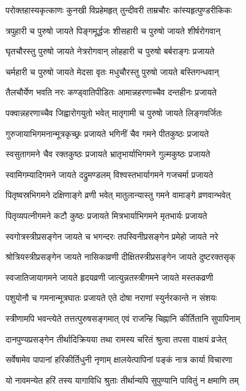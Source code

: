 \twolineshloka
{परोक्तहास्यकृत्काणः कुनखी विप्रहेमहृत्}
{तुन्दीवरी ताम्रचौरः कांस्यहृत्पुण्डरीकिकः}%

\twolineshloka
{त्रपुहारी च पुरुषो जायते पिङ्गमूर्द्धजः}
{शीसहारी च पुरुषो जायते शीर्षरोगवान्}%

\twolineshloka
{घृतचौरस्तु पुरुषो जायते नेत्ररोगवान्}
{लोहहारी च पुरुषो बर्बराङ्गः प्रजायते}%

\twolineshloka
{चर्महारी च पुरुषो जायते मेदसा वृतः}
{मधुचौरस्तु पुरुषो जायते बस्तिगन्धवान्}%

\twolineshloka
{तैलचौर्येण भवति नरः कण्ड्वातिपीडितः}
{आमान्नहरणाच्चैव दन्तहीनः प्रजायते}%

\twolineshloka
{पक्वान्नहरणाच्चैव जिह्वारोगयुतो भवेत्}
{मातृगामी च पुरुषो जायते लिङ्गवर्जितः}%

\twolineshloka
{गुरुजायाभिगमनान्मूत्रकृच्छ्रः प्रजायते}
{भगिनीं चैव गमने पीतकुष्ठः प्रजायते}%

\twolineshloka
{स्वसुतागमने चैव रक्तकुष्ठः प्रजायते}
{भ्रातृभार्याभिगमने गुल्मकुष्ठः प्रजायते}%

\twolineshloka
{स्वामिगम्यादिगमने जायते दद्रुमण्डलम्}
{विश्वस्तभार्यागमने गजचर्मा प्रजायते}%

\twolineshloka
{पितृष्वस्रभिगमने दक्षिणाङ्गे व्रणी भवेत्}
{मातुलान्यास्तु गमने वामाङ्गे व्रणवान्भवेत्}%

\twolineshloka
{पितृव्यपत्नीगमने कटौ कुष्ठः प्रजायते}
{मित्रभार्याभिगमने मृतभार्यः प्रजायते}%

\twolineshloka
{स्वगोत्रस्त्रीप्रसङ्गेन जायते च भगन्दरः}
{तपस्विनीप्रसङ्गेन प्रमेहो जायते नरे}%

\twolineshloka
{श्रोत्रियस्त्रीप्रसङ्गेन जायते नासिकाव्रणी}
{दीक्षितस्त्रीप्रसङ्गेन जायते दुष्टरक्तसृक्}%

\twolineshloka
{स्वजातिजायागमने जायते हृदयव्रणी}
{जात्युन्नतस्त्रीगमने जायते मस्तकव्रणी}%

\twolineshloka
{पशुयोनौ च गमनान्मूत्रघातः प्रजायते}
{एते दोषा नराणां स्युर्नरकान्ते न संशयः}%

\twolineshloka
{स्त्रीणामपि भवन्त्येते तत्तत्पुरुषसङ्गमात्}
{एवं राजन्हि चिह्नानि कीर्तितानि सुपापिनाम्}%

\twolineshloka
{दानपुण्यप्रसङ्गेन तीर्थादिक्रियया तथा}
{रामस्य चरितं श्रुत्वा तपसा वाक्षयं व्रजेत्}%

\twolineshloka
{सर्वेषामेव पापानां हरिकीर्तिधुनी नृणाम्}
{क्षालयेत्पापिनां पङ्कं नात्र कार्या विचारणा}%

\twolineshloka
{यो नावमन्येत हरिं तस्य यागाविधि श्रुताः}
{तीर्थान्यपि सुपुण्यानि पावितुं न क्षमाणि तम्}%

